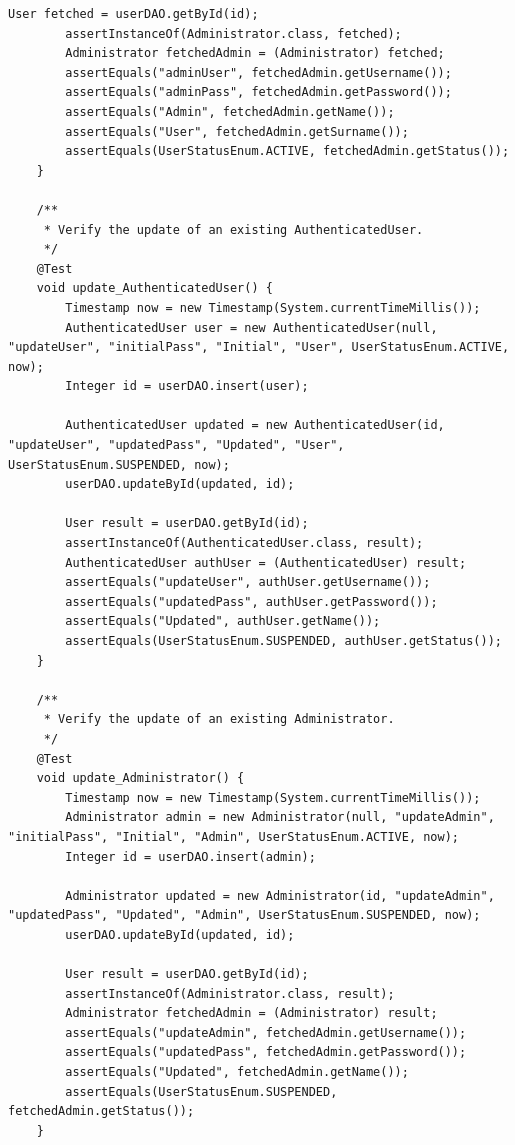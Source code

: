 \documentclass[a4paper]{article}
\begin{document}
\begin{lstlisting}[style=java-style, caption={Esempio test per la classe \texttt{UserTest.java}}]
        User fetched = userDAO.getById(id);
        assertInstanceOf(Administrator.class, fetched);
        Administrator fetchedAdmin = (Administrator) fetched;
        assertEquals("adminUser", fetchedAdmin.getUsername());
        assertEquals("adminPass", fetchedAdmin.getPassword());
        assertEquals("Admin", fetchedAdmin.getName());
        assertEquals("User", fetchedAdmin.getSurname());
        assertEquals(UserStatusEnum.ACTIVE, fetchedAdmin.getStatus());
    }

    /**
     * Verify the update of an existing AuthenticatedUser.
     */
    @Test
    void update_AuthenticatedUser() {
        Timestamp now = new Timestamp(System.currentTimeMillis());
        AuthenticatedUser user = new AuthenticatedUser(null, "updateUser", "initialPass", "Initial", "User", UserStatusEnum.ACTIVE, now);
        Integer id = userDAO.insert(user);

        AuthenticatedUser updated = new AuthenticatedUser(id, "updateUser", "updatedPass", "Updated", "User", UserStatusEnum.SUSPENDED, now);
        userDAO.updateById(updated, id);

        User result = userDAO.getById(id);
        assertInstanceOf(AuthenticatedUser.class, result);
        AuthenticatedUser authUser = (AuthenticatedUser) result;
        assertEquals("updateUser", authUser.getUsername());
        assertEquals("updatedPass", authUser.getPassword());
        assertEquals("Updated", authUser.getName());
        assertEquals(UserStatusEnum.SUSPENDED, authUser.getStatus());
    }

    /**
     * Verify the update of an existing Administrator.
     */
    @Test
    void update_Administrator() {
        Timestamp now = new Timestamp(System.currentTimeMillis());
        Administrator admin = new Administrator(null, "updateAdmin", "initialPass", "Initial", "Admin", UserStatusEnum.ACTIVE, now);
        Integer id = userDAO.insert(admin);

        Administrator updated = new Administrator(id, "updateAdmin", "updatedPass", "Updated", "Admin", UserStatusEnum.SUSPENDED, now);
        userDAO.updateById(updated, id);

        User result = userDAO.getById(id);
        assertInstanceOf(Administrator.class, result);
        Administrator fetchedAdmin = (Administrator) result;
        assertEquals("updateAdmin", fetchedAdmin.getUsername());
        assertEquals("updatedPass", fetchedAdmin.getPassword());
        assertEquals("Updated", fetchedAdmin.getName());
        assertEquals(UserStatusEnum.SUSPENDED, fetchedAdmin.getStatus());
    }


\end{lstlisting}
\end{document}
